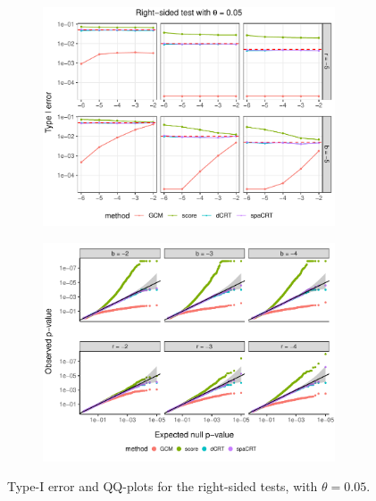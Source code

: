 \documentclass[12pt]{article}
\theoremstyle{definition}
\begin{document}
\begin{figure}[!ht]
  \centering
  \begin{subfigure}{\textwidth}
    \centering
    \includegraphics[width=0.95\textwidth]{figures-and-tables/simulation/Type-I-error/plot-bin-NB-normal-B-50000-n-5000-5e3-n5-n5-disp-5e-2-Type-I-error-RIGHT.pdf}
  \end{subfigure}

  \begin{subfigure}{\textwidth}
    \centering
    \includegraphics[width=0.95\textwidth]{figures-and-tables/simulation/QQ/plot-bin-NB-normal-B-50000-n-5000-5e3-n5-n5-disp-5e-2-QQ-RIGHT.pdf}
  \end{subfigure}
  \caption{Type-I error and QQ-plots for the right-sided tests, with $\theta = 0.05$.}
  \label{fig:simulation-Type-I-error-RIGHT-0.05}
\end{figure}
\end{document}
